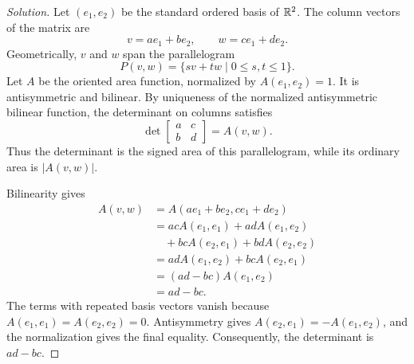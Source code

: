 \begin{proof}[Solution]
Let \((e_1,e_2)\) be the standard ordered basis of \(\mathbb{R}^2\). The column
vectors of the matrix are
\[
  v=ae_1+be_2,\qquad w=ce_1+de_2.
\]
Geometrically, \(v\) and \(w\) span the parallelogram
\[
  P(v,w)=\{sv+tw\mid 0\le s,t\le1\}.
\]
Let \(A\) be the oriented area function, normalized by \(A(e_1,e_2)=1\).
It is antisymmetric and bilinear. By uniqueness of the normalized
antisymmetric bilinear function, the determinant on columns satisfies
\[
  \det\begin{bmatrix}a&c\\b&d\end{bmatrix}=A(v,w).
\]
Thus the determinant is the signed area of this parallelogram, while its
ordinary area is \(|A(v,w)|\).

Bilinearity gives
\begin{align*}
  A(v,w)
    &=A(ae_1+be_2,ce_1+de_2)\\
    &=acA(e_1,e_1)+adA(e_1,e_2)\\
    &\quad+bcA(e_2,e_1)+bdA(e_2,e_2)\\
    &=adA(e_1,e_2)+bcA(e_2,e_1)\\
    &=(ad-bc)A(e_1,e_2)\\
    &=ad-bc.
\end{align*}
The terms with repeated basis vectors vanish because
\(A(e_1,e_1)=A(e_2,e_2)=0\). Antisymmetry gives
\(A(e_2,e_1)=-A(e_1,e_2)\), and the normalization gives the final equality.
Consequently, the determinant is \(ad-bc\).
\end{proof}
